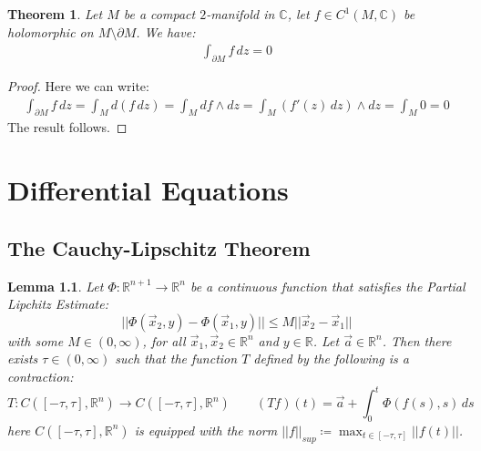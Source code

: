 \documentclass[11pt,oneside]{book}
\theoremstyle{break}
\theoremstyle{break}
\newtheorem{thm}{Theorem}[section]
\newtheorem{lem}{Lemma}[thm]
\newcommand{\R}{\mathbb{R}}
\newcommand{\Complex}{\mathbb{C}}
\begin{document}

\begin{thm}
Let $M$ be a compact $2$-manifold in $\Complex$, let $f \in C^1(M, \Complex)$ be holomorphic on $M \setminus \partial M$. We have:
\begin{align*}
\int_{\partial M}f\, dz = 0
\end{align*}
\end{thm}
\begin{proof}
Here we can write:
\begin{align*}
\int_{\partial M}f\, dz = \int_M d(f\, dz) = \int_M df\wedge dz = \int_{M}(f'(z)\, dz) \wedge dz = \int_{M} 0 =0
\end{align*}
The result follows.
\end{proof}







\newpage







\newpage
\chapter{Differential Equations}
\setcounter{section}{33}
\section[The Cauchy-Lipschitz Theorem]{\color{red}The Cauchy-Lipschitz Theorem\color{black}}
\begin{lem}
Let $\Phi:\R^{n+1} \to \R^n$ be a continuous function that satisfies the Partial Lipchitz Estimate:
$$||\Phi(\vec{x}_2, y) - \Phi(\vec{x}_1,y)|| \leq M||\vec{x}_2-\vec{x}_1||$$
with some $M\in (0,\infty)$, for all $\vec{x}_1,\vec{x}_2 \in \R^n$ and $y \in \R$. Let $\vec{a}\in \R^n$. Then there exists $\tau \in (0,\infty)$ such that the function $T$ defined by the following is a contraction: $$T:C([-\tau,\tau],\R^n) \to C([-\tau,\tau],\R^n)\qquad(Tf)(t)= \vec{a}+\int_0^t\Phi(f(s),s)\, ds$$ here $C([-\tau,\tau],\R^n)$ is equipped with the norm $||f||_{sup} \coloneqq \max_{t\in [-\tau,\tau]} ||f(t)||$.
\end{lem}
\end{document}
